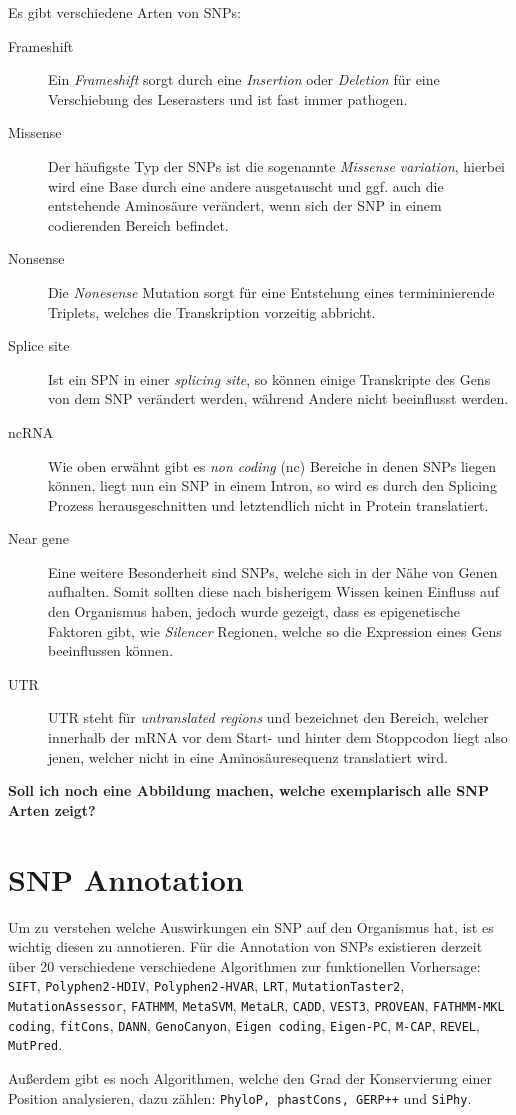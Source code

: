 Es gibt verschiedene Arten von SNPs:

\begin{description}
\item[Frameshift]
Ein \emph{Frameshift} sorgt durch eine \emph{Insertion} oder \emph{Deletion} für eine Verschiebung des Leserasters und ist fast immer pathogen.
\item[Missense]
Der häufigste Typ der SNPs ist die sogenannte \emph{Missense variation}, hierbei wird eine Base durch eine andere ausgetauscht und ggf. auch die entstehende Aminosäure verändert, wenn sich der SNP in einem codierenden Bereich befindet. 
\item[Nonsense]
Die \emph{Nonesense} Mutation sorgt für eine Entstehung eines termininierende Triplets, welches die Transkription vorzeitig abbricht.
\item[Splice site]
Ist ein SPN in einer \emph{splicing site}, so können einige Transkripte des Gens von dem SNP verändert werden, während Andere nicht beeinflusst werden.
\item[ncRNA]
Wie oben erwähnt gibt es \emph{non coding} (nc) Bereiche in denen SNPs liegen können, liegt nun ein SNP in einem Intron, so wird es durch den Splicing Prozess herausgeschnitten und letztendlich nicht in Protein translatiert. 
\item[Near gene]
Eine weitere Besonderheit sind SNPs, welche sich in der Nähe von Genen aufhalten. Somit sollten diese nach bisherigem Wissen keinen Einfluss auf den Organismus haben, jedoch wurde gezeigt, dass es epigenetische Faktoren gibt, wie \emph{Silencer} Regionen, welche so die Expression eines Gens beeinflussen können\cite{Maston.2006}. 
\item[UTR]
UTR steht für \emph{untranslated regions} und bezeichnet den Bereich, welcher innerhalb der mRNA vor dem Start- und hinter dem Stoppcodon liegt also jenen, welcher nicht in eine Aminosäuresequenz translatiert wird.
\end{description}

\textbf{Soll ich noch eine Abbildung machen, welche exemplarisch alle SNP Arten zeigt?}



\section{SNP Annotation}
\begin{sloppypar}
Um zu verstehen welche Auswirkungen ein SNP auf den Organismus hat, ist es wichtig diesen zu annotieren. 
Für die Annotation von SNPs existieren derzeit über 20 verschiedene verschiedene Algorithmen zur funktionellen Vorhersage: \texttt{SIFT}, \texttt{Polyphen2-HDIV}, \texttt{Polyphen2-HVAR}, \texttt{LRT}, \texttt{MutationTaster2}, \texttt{MutationAssessor}, \texttt{FATHMM}, \texttt{MetaSVM}, \texttt{MetaLR}, \texttt{CADD}, \texttt{VEST3}, \texttt{PROVEAN}, \texttt{FATHMM-MKL coding}, \texttt{fitCons}, \texttt{DANN}, \texttt{GenoCanyon}, \texttt{Eigen coding}, \texttt{Eigen-PC}, \texttt{M-CAP}, \texttt{REVEL}, \texttt{MutPred}. 
\end{sloppypar}
Außerdem gibt es noch Algorithmen, welche den Grad der Konservierung einer Position analysieren, dazu zählen: \texttt{PhyloP, phastCons, GERP++} und \texttt{SiPhy}.

